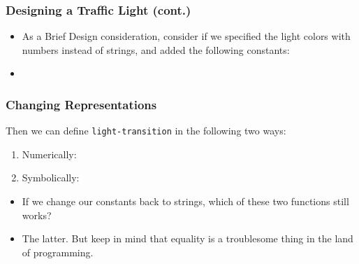 \documentclass{beamer}
\begin{document}



\begin{frame}
  \frametitle{Designing a Traffic Light (cont.)}
  \lightTransitionFull
  \begin{itemize}
  \item<2-> As a Brief Design consideration, consider if we
    specified the light colors with numbers instead of strings,
    and added the following constants:
  \item<3-> \lightNumbers  
  \end{itemize}
\end{frame}

\begin{frame}
  \frametitle{Changing Representations}
   Then we can define \texttt{light-transition}
   in the following two ways:
   \begin{enumerate}
   \item<2-> Numerically: \lightNumeric
   \item<3-> Symbolically: \lightSymbolic
   \end{enumerate}
   \begin{itemize}
   \item<4-> If we change our constants back to strings, which of
     these two functions still works?
   \item<5-> The latter. But keep in mind that equality is a troublesome
     thing in the land of programming.
   \end{itemize}
\end{frame}
\end{document}
